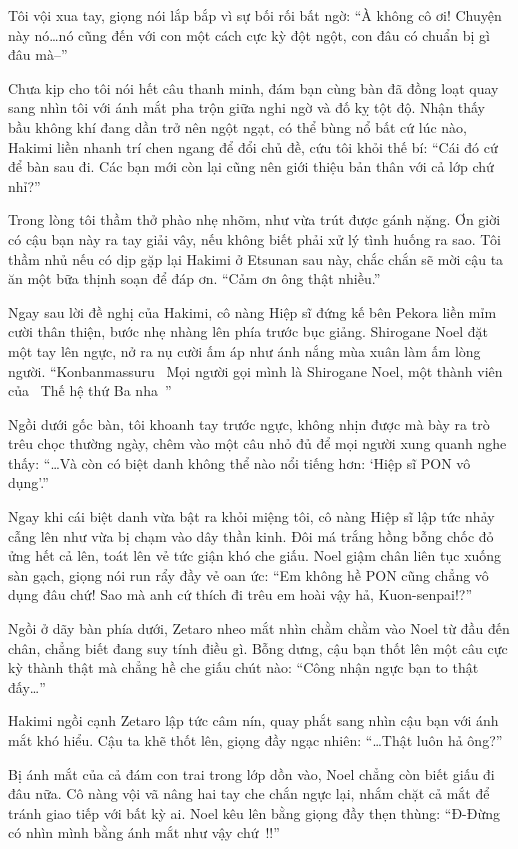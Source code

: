 \documentclass[../main.tex]{subfiles}
\begin{document}
Tôi vội xua tay, giọng nói lắp bắp vì sự bối rối bất ngờ: ``À không cô ơi! Chuyện này nó\dots nó cũng đến với con một cách cực kỳ đột ngột, con đâu có chuẩn bị gì đâu mà--''

Chưa kịp cho tôi nói hết câu thanh minh, đám bạn cùng bàn đã đồng loạt quay sang nhìn tôi với ánh mắt pha trộn giữa nghi ngờ và đố kỵ tột độ. Nhận thấy bầu không khí đang dần trở nên ngột ngạt, có thể bùng nổ bất cứ lúc nào, Hakimi liền nhanh trí chen ngang để đổi chủ đề, cứu tôi khỏi thế bí: ``Cái đó cứ để bàn sau đi. Các bạn mới còn lại cũng nên giới thiệu bản thân với cả lớp chứ nhỉ?''

Trong lòng tôi thầm thở phào nhẹ nhõm, như vừa trút được gánh nặng. Ơn giời có cậu bạn này ra tay giải vây, nếu không biết phải xử lý tình huống ra sao. Tôi thầm nhủ nếu có dịp gặp lại Hakimi ở Etsunan sau này, chắc chắn sẽ mời cậu ta ăn một bữa thịnh soạn để đáp ơn. ``Cảm ơn ông thật nhiều.''

Ngay sau lời đề nghị của Hakimi, cô nàng Hiệp sĩ đứng kế bên Pekora liền mỉm cười thân thiện, bước nhẹ nhàng lên phía trước bục giảng. Shirogane Noel đặt một tay lên ngực, nở ra nụ cười ấm áp như ánh nắng mùa xuân làm ấm lòng người. ``Konbanmassuru~ Mọi người gọi mình là Shirogane Noel, một thành viên của \hll\ Thế hệ thứ Ba nha~''

Ngồi dưới gốc bàn, tôi khoanh tay trước ngực, không nhịn được mà bày ra trò trêu chọc thường ngày, chêm vào một câu nhỏ đủ để mọi người xung quanh nghe thấy: ``\dots Và còn có biệt danh không thể nào nổi tiếng hơn: `Hiệp sĩ PON vô dụng'.''

Ngay khi cái biệt danh vừa bật ra khỏi miệng tôi, cô nàng Hiệp sĩ lập tức nhảy cẫng lên như vừa bị chạm vào dây thần kinh. Đôi má trắng hồng bỗng chốc đỏ ửng hết cả lên, toát lên vẻ tức giận khó che giấu. Noel giậm chân liên tục xuống sàn gạch, giọng nói run rẩy đầy vẻ oan ức: ``Em không hề PON cũng chẳng vô dụng đâu chứ! Sao mà anh cứ thích đi trêu em hoài vậy hả, Kuon-senpai!?''

Ngồi ở dãy bàn phía dưới, Zetaro nheo mắt nhìn chằm chằm vào Noel từ đầu đến chân, chẳng biết đang suy tính điều gì. Bỗng dưng, cậu bạn thốt lên một câu cực kỳ thành thật mà chẳng hề che giấu chút nào: ``Công nhận ngực bạn to thật đấy\dots''

Hakimi ngồi cạnh Zetaro lập tức câm nín, quay phắt sang nhìn cậu bạn với ánh mắt khó hiểu. Cậu ta khẽ thốt lên, giọng đầy ngạc nhiên: ``\dots Thật luôn hả ông?''

Bị ánh mắt của cả đám con trai trong lớp dồn vào, Noel chẳng còn biết giấu đi đâu nữa. Cô nàng vội vã nâng hai tay che chắn ngực lại, nhắm chặt cả mắt để tránh giao tiếp với bất kỳ ai. Noel kêu lên bằng giọng đầy thẹn thùng: ``Đ-Đừng có nhìn mình bằng ánh mắt như vậy chứ~!!''
\end{document}
